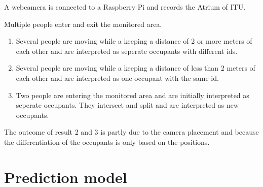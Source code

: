 A webcamera is connected to a Raspberry Pi and records the Atrium of ITU.

Multiple people enter and exit the monitored area.

\begin{enumerate}
\item Several people are moving while a keeping a distance of 2 or more meters of each other and are interpreted as seperate occupants with different ids.
\item Several people are moving while a keeping a distance of less than 2 meters of each other and are interpreted as one occupant with the same id.
\item Two people are entering the monitored area and are initially interpreted as seperate occupants. They intersect and split and are interpreted as new occupants.
\end{enumerate}

The outcome of result 2 and 3 is partly due to the camera placement and because the differentiation of the occupants is only based on the positions. 

\section{Prediction model}
\label{eval_prediction}